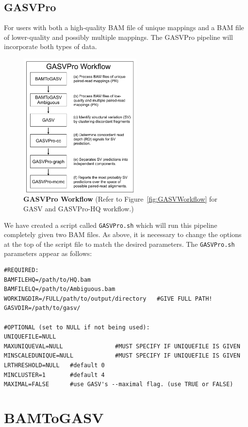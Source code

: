 \documentclass[11pt]{article}
\begin{document}
\subsection{GASVPro}
For users with both a high-quality BAM file of unique mappings and a BAM file of lower-quality and possibly multiple mappings. The GASVPro pipeline will incorporate both types of data. 

\begin{figure}[htbp]
   \centering
    \includegraphics[width=0.55\textwidth]{Figures/GASVPro_Workflow.pdf}
  \caption{\textbf{GASVPro Workflow} (Refer to Figure~\ref{fig:GASVWorkflow} for GASV and GASVPro-HQ workflow.)}
  \label{fig:GASVProWorkflow}
\end{figure}

We have created a script called \verb+GASVPro.sh+ which will run this pipeline completely given two BAM files. As above, it is necessary to change the options at the top of the script file to match the desired parameters. The \verb+GASVPro.sh+ parameters appear as follows:
\begin {Verbatim}[frame=single]
#REQUIRED:
BAMFILEHQ=/path/to/HQ.bam
BAMFILELQ=/path/to/Ambiguous.bam
WORKINGDIR=/FULL/path/to/output/directory   #GIVE FULL PATH!
GASVDIR=/path/to/gasv/
                  
#OPTIONAL (set to NULL if not being used):
UNIQUEFILE=NULL
MAXUNIQUEVAL=NULL               #MUST SPECIFY IF UNIQUEFILE IS GIVEN
MINSCALEDUNIQUE=NULL            #MUST SPECIFY IF UNIQUEFILE IS GIVEN
LRTHRESHOLD=NULL   #default 0
MINCLUSTER=1       #default 4
MAXIMAL=FALSE      #use GASV's --maximal flag. (use TRUE or FALSE)
\end{Verbatim}

\section{BAMToGASV}
\end{document}
